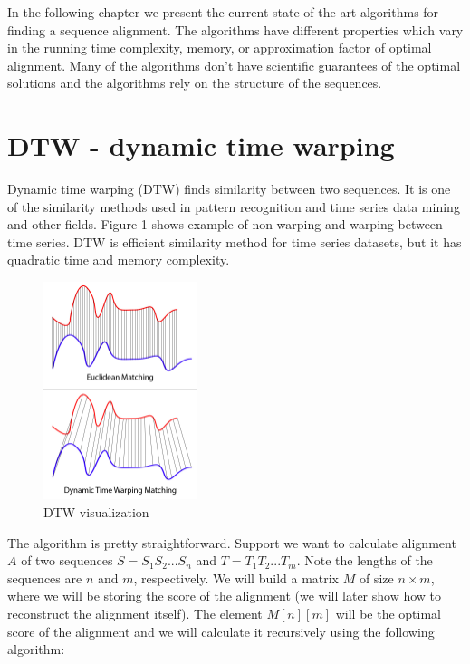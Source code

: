 In the following chapter we present the current state of the art algorithms for finding a sequence
alignment. The algorithms have different properties which vary in the running time complexity,
memory, or approximation factor of optimal alignment. Many of the algorithms don't have scientific
guarantees of the optimal solutions and the algorithms rely on the structure of the sequences.

\section{DTW - dynamic time warping}
\label{section:dtw}

Dynamic time warping (DTW) finds similarity between two sequences. It is one of the similarity
methods used in pattern recognition and time series data mining and other fields. Figure 1 shows
example of non-warping and warping between time series. DTW is efficient similarity method for time
series datasets, but it has quadratic time and memory complexity.

\begin{figure}[H]
  \centerline{\includegraphics[width=0.4\textwidth]{images/dtw}}
  \caption[DTW]{DTW visualization}
  \label{obr:dtw}
\end{figure}

The algorithm is pretty straightforward. Support we want to calculate alignment $A$ of two sequences
$S = S_1S_2...S_n$ and $T = T_1T_2...T_m$. Note the lengths of the sequences are $n$ and $m$,
respectively. We will build a matrix $M$ of size $n \times m$, where we will be storing the score of
the alignment (we will later show how to reconstruct the alignment itself). The element $M[n][m]$
will be the optimal score of the alignment and we will calculate it recursively using the following
algorithm:

